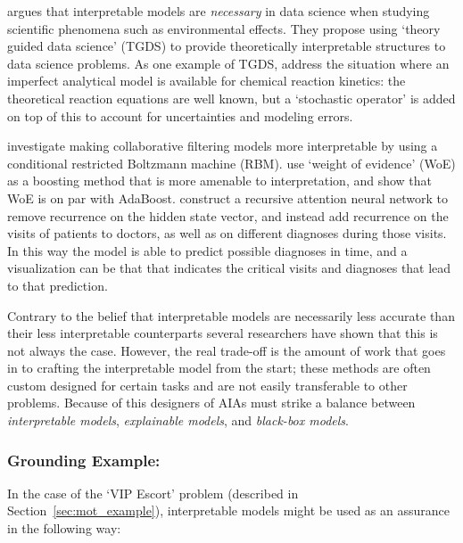 \citet{Kumar2016-yw,Faghmous2014-og} argues that interpretable models are \emph{necessary} in data science when studying scientific phenomena such as environmental effects. They propose using `theory guided data science' (TGDS) to provide theoretically interpretable structures to data science problems. As one example of TGDS, \citet{Morrison2016-fz} address the situation where an imperfect analytical model is available for chemical reaction kinetics: the theoretical reaction equations are well known, but a `stochastic operator' is added on top of this to account for uncertainties and modeling errors. 

\citet{Abdollahi2016-vn} investigate making collaborative filtering models more interpretable by using a conditional restricted Boltzmann machine (RBM). \citet{Ridgeway1998-lv} use `weight of evidence' (WoE) as a boosting method that is more amenable to interpretation, and show that WoE is on par with AdaBoost. \citet{Choi2016-by} construct a recursive attention neural network to remove recurrence on the hidden state vector, and instead add recurrence on the visits of patients to doctors, as well as on different diagnoses during those visits. In this way the model is able to predict possible diagnoses in time, and a visualization can be that that indicates the critical visits and diagnoses that lead to that prediction.

Contrary to the belief that interpretable models are necessarily less accurate than their less interpretable counterparts several researchers have shown that this is not always the case. However, the real trade-off is the amount of work that goes in to crafting the interpretable model from the start; these methods are often custom designed for certain tasks and are not easily transferable to other problems. Because of this designers of AIAs must strike a balance between \emph{interpretable models}, \emph{explainable models}, and \emph{black-box models}.

\subsubsection{Grounding Example:}
In the case of the `VIP Escort' problem (described in Section~\ref{sec:mot_example}), interpretable models might be used as an assurance in the following way:

